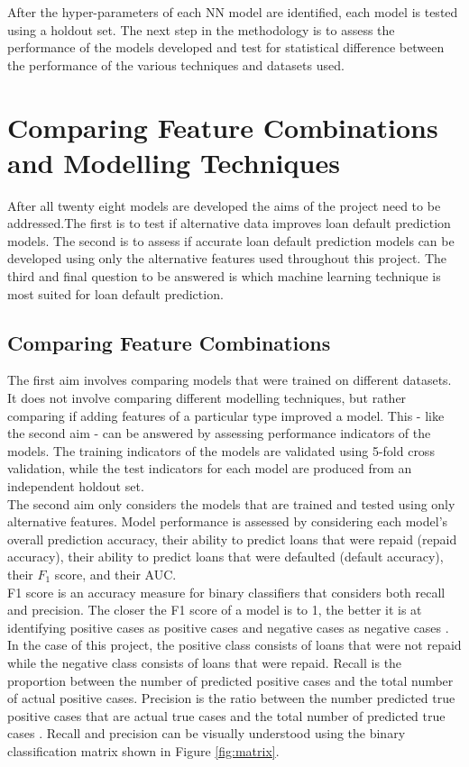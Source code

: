 After the hyper-parameters of each NN model are identified, each model is tested using a holdout set. The next step in the methodology is to assess the performance of the models developed and test for statistical difference between the performance of the various techniques and datasets used. \\



\section{Comparing Feature Combinations and Modelling Techniques}

After all twenty eight models are developed the aims of the project need to be addressed.The first is to test if alternative data improves loan default prediction models. The second is to assess if accurate loan default prediction models can be developed using only the alternative features used throughout this project. The third and final question to be answered is which machine learning technique is most suited for loan default prediction. \\

\subsection{Comparing Feature Combinations}

The first aim involves comparing models that were trained on different datasets. It does not involve comparing different modelling techniques, but rather comparing if adding features of a particular type improved a model. This - like the second aim - can be answered by assessing performance indicators of the models. The training indicators of the models are validated using 5-fold cross validation, while the test indicators for each model are produced from an independent holdout set. \\

The second aim only considers the models that are trained and tested using only alternative features. Model performance is assessed by considering each model's overall prediction accuracy, their ability to predict loans that were repaid (repaid accuracy), their ability to predict loans that were defaulted (default accuracy), their $F_1$ score, and their AUC. \\

F1 score is an accuracy measure for binary classifiers that considers both recall and precision. The closer the F1 score of a model is to 1, the better it is at identifying positive cases as positive cases and negative cases as negative cases \parencite{f1}. In the case of this project, the positive class consists of loans that were not repaid while the negative class consists of loans that were repaid. Recall is the proportion between the number of predicted positive cases and the total number of actual positive cases. Precision is the ratio between the number predicted true positive cases that are actual true cases and the total number of predicted true cases \parencite{f1}. Recall and precision can be visually understood using the binary classification matrix shown in Figure \ref{fig:matrix}. 

